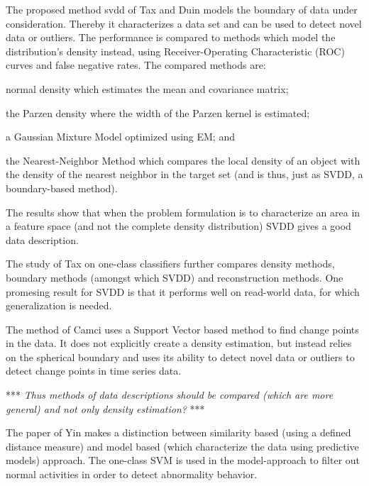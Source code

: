 The proposed method \gls{svdd} of Tax and Duin \cite{tax1999support, tax2004support} models the boundary of data under consideration.
Thereby it characterizes a data set and can be used to detect novel data or outliers.
The performance is compared to methods which model the distribution's density instead, using Receiver-Operating Characteristic (ROC) curves and false negative rates.
The compared methods are:
\begin{inparaenum}[\itshape (1)]
  \item normal density which estimates the mean and covariance matrix;
  \item the Parzen density where the width of the Parzen kernel is estimated;
  \item a Gaussian Mixture Model optimized using EM; and
  \item the Nearest-Neighbor Method which compares the local density of an object with the density of the nearest neighbor in the target set (and is thus, just as SVDD, a boundary-based method).
\end{inparaenum}
The results show that when the problem formulation is to characterize an area in a feature space (and not the complete density distribution) SVDD gives a good data description.

The study of Tax on one-class classifiers \cite{tax2001one} further compares density methods, boundary methods (amongst which SVDD) and reconstruction methods.
One promesing result for SVDD is that it performs well on read-world data, for which generalization is needed.

The method of Camci \cite{camci2010change} uses a Support Vector based method to find change points in the data.
It does not explicitly create a density estimation, but instead relies on the spherical boundary and uses its ability to detect novel data or outliers to detect change points in time series data.

*** \emph{Thus methods of data descriptions should be compared (which are more general) and not only density estimation?} ***

The paper of Yin \etal \cite{yin2008sensor} makes a distinction between similarity based (using a defined distance measure) and model based (which characterize the data using predictive models) approach.
The one-class SVM is used in the model-approach to filter out normal activities in order to detect abnormality behavior.


